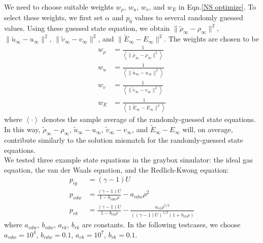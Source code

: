 \documentclass[a4paper,onecolumn]{article}
\theoremstyle{remark}
\begin{document}
\indent We need to choose suitable weights $w_\rho$, $w_u$, $w_v$, and $w_E$ in
Eqn.\eqref{NS optimize}. To select these weights, 
we first set $\alpha$ and $p_0$ values to several randomly guessed values. 
Using these guessed state equation, we 
obtain $\|\tilde{\rho}_{\infty} - \rho_{\infty}\|^2$,
$\|\tilde{u}_{\infty}- u_{\infty}\|^2 $,
$ \|\tilde{v}_{\infty}- v_{\infty}\|^2$,
and $\|\tilde{E}_{\infty} - E_\infty\|^2$.
The weights are chosen to be
\begin{equation}\begin{split}
    w_\rho &= \frac{1}{\left<\|\tilde{\rho}_{\infty} - \rho_{\infty}\|^2\right>}\\
    w_u &= \frac{1}{\left<\|\tilde{u}_{\infty} - 
    {u}_{\infty}\|^2\right>}\\
    w_v &= \frac{1}{\left<\|\tilde{v}_{\infty} - 
    v_{\infty}\|^2\right>}\\
    w_E &= \frac{1}{\left<\|\tilde{E}_{\infty} - 
    E_{\infty}\|^2\right>}
\end{split}
\label{NS weights}
\end{equation}
where $\left<\cdot\right>$ denotes the sample average of the randomly-guessed state equations.
In this way, $\tilde{\rho}_\infty-\rho_\infty$, 
$\tilde{u}_{\infty}-u_\infty$, $\tilde{v}_{\infty}-v_\infty$,
and $\tilde{E}_\infty-E_\infty$ will, on average, contribute
similarly to the solution mismatch for the randomly-guessed state equations.\\

\indent We tested three example state equations in the graybox simulator:
the ideal gas equation, the van der Waals equation, and the Redlich-Kwong equation:
\begin{equation}\begin{split}
    p_{ig} &= (\gamma-1) U\\
    p_{vdw} &= \frac{(\gamma-1)U}{1-b_{vdw}\rho} - a_{vdw}\rho^2\\
    p_{rk} &= \frac{(\gamma-1)U}{1-b_{rk}\rho} - 
    \frac{a_{rk}\rho^{5/2}}{((\gamma-1)U)^{1/2}(1+b_{rk}\rho)}
\end{split}\label{NS state equations}
\end{equation}
where $a_{vdw}$, $b_{vdw}$, $a_{rk}$, $b_{rk}$ are constants. In the following testcases, we choose
$a_{vdw}=10^4$, $b_{vdw}=0.1$, $a_{rk}=10^7$, $b_{rk}=0.1$.\\
\end{document}

